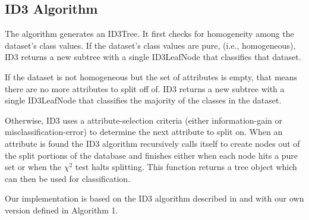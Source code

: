 \documentclass{IEEEtran}
\begin{document}
\subsection{ID3 Algorithm}
The algorithm generates an ID3Tree. It first checks for homogeneity
among the dataset's class values. If the dataset's class values are
pure, (i.e., homogeneous), ID3 returns a new subtree with a single
ID3LeafNode that classifies that dataset.

If the dataset is not homogeneous but the set of attributes is empty,
that means there are no more attributes to split off of. ID3 returns a
new subtree with a single ID3LeafNode that classifies the majority of
the classes in the dataset.

Otherwise, ID3 uses a attribute-selection criteria (either
information-gain or misclassification-error) to determine the next
attribute to split on. When an attribute is found the ID3 algorithm
recursively calls itself to create nodes out of the split portions of
the database and finishes either when each node hits a pure set or
when the $\chi^2$ test halts splitting. This function returns a tree
object which can then be used for classification.

Our implementation is based on the ID3 algorithm described
in \parencite{quinlan1986induction} and with our own version defined
in Algorithm 1. 
\end{document}
